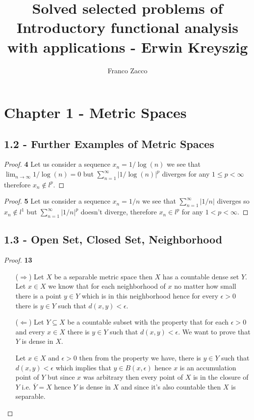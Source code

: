 \documentclass[11pt]{article}
\title{\textbf{Solved selected problems of Introductory functional analysis with applications - Erwin Kreyszig}}
\author{Franco Zacco}
\date{}
\theoremstyle{definition}
\begin{document}
\maketitle
\thispagestyle{empty}

\section*{Chapter 1 - Metric Spaces}
\subsection*{1.2 - Further Examples of Metric Spaces}
\begin{proof}{\textbf{4}}
    Let us consider a sequence $x_n = 1/\log(n)$ we see that\\
    $\lim_{n \to \infty}1/\log(n) = 0$ but
    $\sum_{n=1}^\infty |1/\log(n)|^p$ diverges for any $1 \leq p < \infty$
    therefore $x_n \not\in l^p$.
\end{proof}
\begin{proof}{\textbf{5}}
    Let us consider a sequence $x_n = 1/n$ we see that
    $\sum_{n=1}^\infty \left|1/n\right|$ diverges so $x_n \not\in l^1$ but
    $\sum_{n=1}^\infty |1/n|^p$ doesn't diverge,
    therefore $x_n \in l^p$ for any $1 < p < \infty$.
\end{proof}
\subsection*{1.3 -  Open Set, Closed Set, Neighborhood}
\begin{proof}{\textbf{13}}
\begin{itemize}
    \item [($\Rightarrow$)] Let $X$ be a separable metric space then $X$
    has a countable dense set $Y$. Let $x \in X$ we know that for each
    neighborhood of $x$ no matter how small there is a point $y \in Y$
    which is in this neighborhood hence for every $\epsilon > 0$ there is
    $y\in Y$ such that $d(x,y) < \epsilon$.

    \item [($\Leftarrow$)] Let $Y\subseteq X$ be a countable subset with the
    property that for each $\epsilon > 0$ and every $x \in X$ there is
    $y \in Y$ such that $d(x,y) < \epsilon$. We want to prove that $Y$
    is dense in $X$.

    Let $x \in X$ and $\epsilon > 0$ then from the property we have, there is
    $y \in Y$ such that $d(x,y) <\epsilon$ which implies that
    $y \in B(x, \epsilon)$ hence $x$ is an accumulation point of $Y$ but since
    $x$ was arbitrary then every point of $X$ is in the closure of $Y$ i.e.
    $\overline{Y} = X$ hence $Y$ is dense in $X$ and since it's also countable
    then $X$ is separable.      
\end{itemize}
\end{proof}
\cleardoublepage
\end{document}
